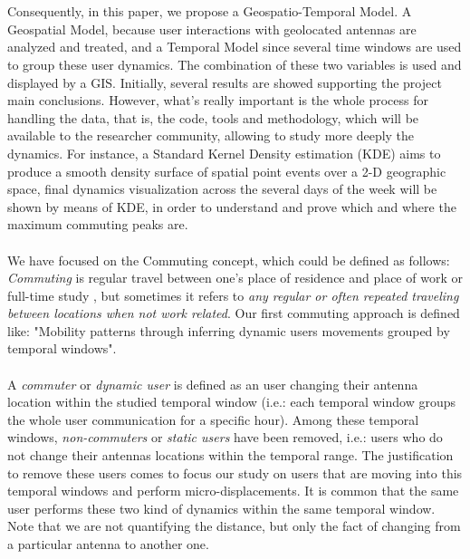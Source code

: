 \\
\\
Consequently, in this paper, we propose a Geospatio-Temporal Model. A Geospatial Model, because user interactions with geolocated antennas are analyzed and treated, and a Temporal Model since several time windows are used to group these user dynamics. The combination of these two variables is used and displayed by a GIS. Initially, several results are showed supporting the project main conclusions. However, what's really important is the whole process for handling the data, that is, the code, tools and methodology, which will be available to the researcher community, allowing to study more deeply the dynamics. For instance, a Standard Kernel Density estimation (KDE) aims to produce a smooth density surface of spatial point events over a 2-D geographic space\citep{SIM:SIM4780090616,5969036}, final dynamics visualization across the several days of the week will be shown by means of KDE, in order to understand and prove which and where the maximum commuting peaks are.
\\
\\
We have focused on the Commuting concept, which could be defined as follows: \emph{Commuting} is regular travel between one's place of residence and place of work or full-time study \citep{wiki:commuting}, but  sometimes it refers to \emph{any regular or often repeated traveling between locations when not work related}. Our first commuting approach is defined like: "Mobility patterns through inferring dynamic users movements grouped by temporal windows". 
\\
\\
A {\it commuter} or {\it dynamic user} is defined as an user changing their antenna location within the studied temporal window (i.e.: each temporal window groups the whole user communication for a specific hour). Among these temporal windows, {\it non-commuters} or {\it static users} have been removed, i.e.: users who do not change their antennas locations within the temporal range. The justification to remove these users comes to focus our study on users that are moving into this temporal windows and perform micro-displacements. It is common that the same user performs these two kind of dynamics within the same temporal window. Note that we are not quantifying the distance, but only the fact of changing from a particular antenna to another one.
\\
\\